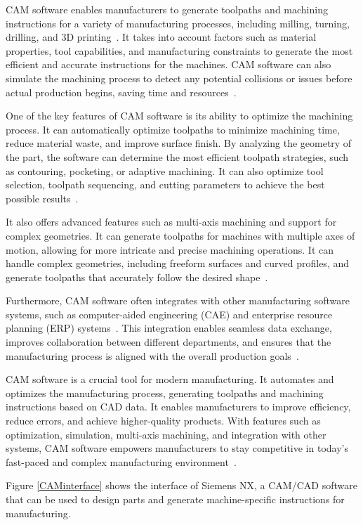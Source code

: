 CAM software enables manufacturers to generate toolpaths and machining instructions for a variety of manufacturing processes, including milling, turning, drilling, and 3D printing~\cite{Kumar.2019}. It takes into account factors such as material properties, tool capabilities, and manufacturing constraints to generate the most efficient and accurate instructions for the machines. CAM software can also simulate the machining process to detect any potential collisions or issues before actual production begins, saving time and resources~\cite{Bui.2019}.

One of the key features of CAM software is its ability to optimize the machining process. It can automatically optimize toolpaths to minimize machining time, reduce material waste, and improve surface finish. By analyzing the geometry of the part, the software can determine the most efficient toolpath strategies, such as contouring, pocketing, or adaptive machining. It can also optimize tool selection, toolpath sequencing, and cutting parameters to achieve the best possible results~\cite{Kyratsis.2020}.

It also offers advanced features such as multi-axis machining and support for complex geometries. It can generate toolpaths for machines with multiple axes of motion, allowing for more intricate and precise machining operations. It can handle complex geometries, including freeform surfaces and curved profiles, and generate toolpaths that accurately follow the desired shape~\cite{Liang.2021}.

Furthermore, CAM software often integrates with other manufacturing software systems, such as computer-aided engineering (CAE) and enterprise resource planning (ERP) systems~\cite{Ramazanov.2020}. This integration enables seamless data exchange, improves collaboration between different departments, and ensures that the manufacturing process is aligned with the overall production goals~\cite{Kadam.2023}.

CAM software is a crucial tool for modern manufacturing. It automates and optimizes the manufacturing process, generating toolpaths and machining instructions based on CAD data. It enables manufacturers to improve efficiency, reduce errors, and achieve higher-quality products. With features such as optimization, simulation, multi-axis machining, and integration with other systems, CAM software empowers manufacturers to stay competitive in today's fast-paced and complex manufacturing environment~\cite{Kappmeyer.2021}.

Figure \ref{CAMinterface} shows the interface of Siemens NX, a CAM/CAD software that can be used to design parts and generate machine-specific instructions for manufacturing. 

